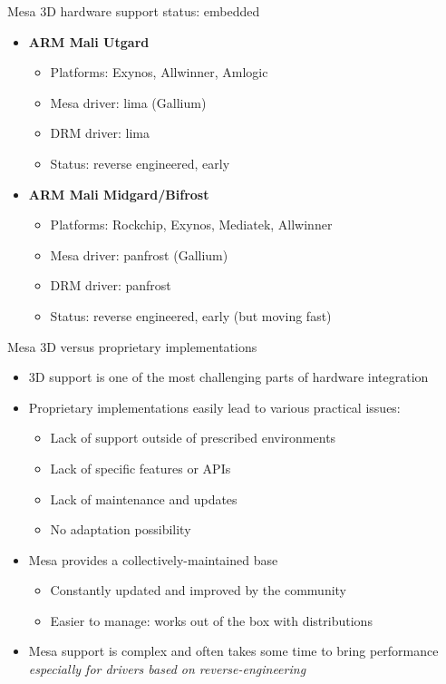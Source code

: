 \begin{frame}{Mesa 3D hardware support status: embedded}
  \begin{itemize}
  \item \textbf{ARM Mali Utgard}
    \begin{itemize}
    \item Platforms: Exynos, Allwinner, Amlogic
    \item Mesa driver: lima (Gallium)
    \item DRM driver: lima
    \item Status: reverse engineered, early
    \end{itemize}
  \item \textbf{ARM Mali Midgard/Bifrost}
    \begin{itemize}
    \item Platforms: Rockchip, Exynos, Mediatek, Allwinner
    \item Mesa driver: panfrost (Gallium)
    \item DRM driver: panfrost
    \item Status: reverse engineered, early (but moving fast)
    \end{itemize}
  \end{itemize}
\end{frame}

\begin{frame}{Mesa 3D versus proprietary implementations}
  \begin{itemize}
  \item 3D support is one of the most challenging parts of hardware integration
  \item Proprietary implementations easily lead to various practical issues:
    \begin{itemize}
    \item Lack of support outside of prescribed environments
    \item Lack of specific features or APIs
    \item Lack of maintenance and updates
    \item No adaptation possibility
    \end{itemize}
  \item Mesa provides a collectively-maintained base
    \begin{itemize}
    \item Constantly updated and improved by the community
    \item Easier to manage: works out of the box with distributions
    \end{itemize}
  \item Mesa support is complex and often takes some time to bring performance\\
    \textit{especially for drivers based on reverse-engineering}
  \end{itemize}
\end{frame}

